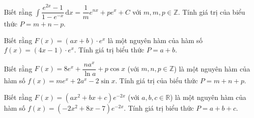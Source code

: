 \begin{ex}%
	Biết rằng $\displaystyle\int \dfrac{e^{2x}-1}{1-e^{-x}}\mathrm{\,d}x=\dfrac{1}{m}e^{nx}+pe^x+C$ với $m,m,p\in \mathbb{Z}$. Tính giá trị của biểu thức $P=m+n-p$.
\end{ex}

\begin{ex}%
	Biết rằng $F(x)=(ax+b)\cdot e^x$ là một nguyên hàm của hàm số $f(x)=(4x-1)\cdot e^x$. Tính giá trị biểu thức $P=a+b$.
\end{ex}

\begin{ex}%
	Biết rằng $F(x)=8e^x+\dfrac{na^x}{\ln a}+p\cos x$ (với $m,n,p\in \mathbb{Z}$) là một nguyên hàm của hàm số $f(x)=me^x+2a^x-2\sin x$. Tính giá trị của biểu thức $P=m+n+p$.
\end{ex}

\begin{ex}%
	Biết rằng  $F(x)=(ax^2+bx+c)e^{-2x}$ (với $a,b,c\in \mathbb{R}$) là một nguyên hàm của hàm số $f(x)=(-2x^2+8x-7)e^{-2x}$. Tính giá trị biểu thức $P=a+b+c$.
\end{ex}
